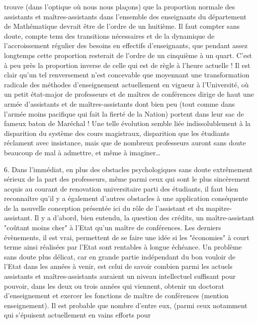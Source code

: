 \documentclass[11pt,a4paper]{article}
\begin{document}

trouve (dans l'optique où nous nous plaçons) que la proportion normale des assistants et maîtres-assistants dans l'ensemble des enseignants du département de Mathématique devrait être de l'ordre de un huitième. Il faut compter sans doute, compte tenu des transitions nécessaires et de la dynamique de l'accroissement régulier des besoins en effectifs d'enseignants, que pendant assez longtemps cette proportion resterait de l'ordre de un cinquième à un quart. C'est à peu près la proportion inverse de celle qui est de règle à l'heure actuelle ! Il est clair qu'un tel renversement n'est concevable que moyennant une transformation radicale des méthodes d'enseignement actuellement en vigueur à l'Université, où un petit état-major de professeurs et de maîtres de conférences dirige de haut une armée d'assistants et de maîtres-assistants dont bien peu (tout comme dans l'armée moins pacifique qui fait la fierté de la Nation) portent dans leur sac de fameux baton de Maréchal ! Une telle évolution semble liée indissolublement à la disparition du système des cours magistraux, disparition que les étudiants réclament avec insistance, mais que de nombreux professeurs auront sans doute beaucoup de mal à admettre, et même à imaginer…

6. Dans l'immédiat, en plus des obstacles psychologiques sans doute extrêmement sérieux de la part des professeurs, même parmi ceux qui sont le plus sincèrement acquis au courant de renovation universitaire parti des étudiants, il faut bien reconnaître qu'il y a également d'autres obstacles à une application conséquente de la nouvelle conception présentée ici du rôle de l'assistant et du mapitre-assistant. Il y a d'abord, bien entendu, la question des crédits, un maître-assistant "coûtant moins cher" à l'Etat qu'un maître de conférences. Les derniers évènements, il est vrai, permettent de se faire une idée si les "économies" à court terme ainsi réalisées par l'Etat sont rentables à longue échéance. Un problème sans doute plus délicat, car en grande partie indépendant du bon vouloir de l'Etat dans les années à venir, est celui de savoir combien parmi les actuels assistants et maîtres-assistants auraient un niveau intellectuel suffisant pour pouvoir, dans les deux ou trois années qui viennent, obtenir un doctorat d'enseignement et exercer les fonctions de maître de conférences (mention enseignement). Il est probable que nombre d'entre eux, (parmi ceux notamment qui s'épuisent actuellement en vains efforts pour
\end{document}
